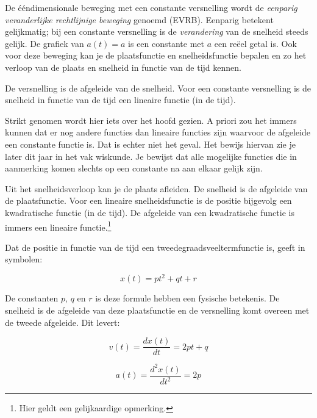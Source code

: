 \documentclass{ximera}
\begin{document}
	\author{Bart Lambregs}
    \xmsource\xmuitleg



De ééndimensionale beweging met een constante  versnelling wordt de \textit{eenparig veranderlijke rechtlijnige beweging} genoemd (EVRB). 
Eenparig betekent gelijkmatig; bij een constante versnelling is de \textit{verandering} van de snelheid steeds gelijk.
De grafiek van $a(t)=a$ is een constante met $a$ een reëel getal is.
Ook voor deze beweging kan je de plaatsfunctie en snelheidsfunctie bepalen en zo het verloop van de plaats en snelheid in functie van de tijd kennen. 


De versnelling is de afgeleide van de snelheid. 
Voor een constante versnelling is de snelheid in functie van de tijd een lineaire functie (in de tijd).


\begin{remark}
	Strikt genomen wordt hier iets over het hoofd gezien. 
	A priori zou het immers kunnen dat er nog andere functies dan lineaire functies zijn waarvoor de afgeleide een constante functie is. 
	Dat is echter niet het geval. 
	Het bewijs hiervan zie je later dit jaar in het vak wiskunde. 
	Je bewijst dat alle mogelijke functies die in aanmerking komen slechts op een constante na aan elkaar gelijk zijn. 
\end{remark}

Uit het snelheidsverloop kan je de plaats afleiden. 
De snelheid is de afgeleide van de plaatsfunctie. 
Voor een lineaire snelheidsfunctie is de positie bijgevolg een kwadratische functie (in de tijd). 
De afgeleide van een kwadratische functie is immers een lineaire functie.\footnote{Hier geldt een gelijkaardige opmerking.}
	
Dat de positie in functie van de tijd een tweedegraadsveeltermfunctie is, geeft in symbolen: 


\[
x(t)=pt^2+qt+r
\]

De constanten $p$, $q$ en $r$ is deze formule hebben een fysische betekenis. 
De snelheid is de afgeleide van deze plaatsfunctie en de versnelling komt overeen met de tweede afgeleide. Dit levert: 

\[
v(t) =\frac{dx(t)}{dt}=2pt+q
\]

\[
a(t) =\frac{d^2x(t)}{dt^2}=2p
\]
\end{document}
